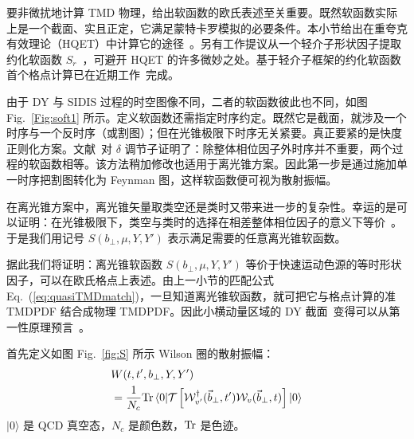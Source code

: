 要非微扰地计算 TMD 物理，给出软函数的欧氏表述至关重要。既然软函数实际上是一个截面、实且正定，它满足蒙特卡罗模拟的必要条件。本小节给出在重夸克有效理论（HQET）中计算它的途径~\cite{Ji:2019sxk}。另有工作提议从一个轻介子形状因子提取约化软函数 $S_r$~\cite{Ji:2019sxk}，可避开 HQET 的许多微妙之处。基于轻介子框架的约化软函数首个格点计算已在近期工作~\cite{Zhang:2020dbb}完成。

由于 DY 与 SIDIS 过程的时空图像不同，二者的软函数彼此也不同，如图 Fig.~\ref{Fig:soft1} 所示。定义软函数还需指定时序约定。既然它是截面，就涉及一个时序与一个反时序（或割图）；但在光锥极限下时序无关紧要。真正要紧的是快度正则化方案。文献~\cite{Vladimirov:2017ksc}对 $\delta$ 调节子证明了：除整体相位因子外时序并不重要，两个过程的软函数相等。该方法稍加修改也适用于离光锥方案。因此第一步是通过施加单一时序把割图转化为 Feynman 图，这样软函数便可视为散射振幅。

在离光锥方案中，离光锥矢量取类空还是类时又带来进一步的复杂性。幸运的是可以证明：在光锥极限下，类空与类时的选择在相差整体相位因子的意义下等价~\cite{future}。于是我们用记号 $S(b_\perp,\mu,Y,Y')$ 表示满足需要的任意离光锥软函数。

据此我们将证明：离光锥软函数 $S(b_\perp,\mu,Y,Y')$ 等价于快速运动色源的等时形状因子，可以在欧氏格点上表述。由上一小节的匹配公式 Eq.~(\ref{eq:quasiTMDmatch})，一旦知道离光锥软函数，就可把它与格点计算的准 TMDPDF 结合成物理 TMDPDF。因此小横动量区域的 DY 截面~\cite{Collins:1984kg}变得可以从第一性原理预言~\cite{Ji:2019sxk}。

首先定义如图 Fig.~\ref{fig:S} 所示 Wilson 圈的散射振幅：
\begin{align}\label{eq:W_t}
	&W(t,t',b_\perp,Y,Y')\nonumber \\
	&=\frac{1}{N_c}{\rm Tr\,}\langle0|{\cal T} \left[{\cal W}^{\dagger}_{v'}(\vec{b}_\perp,t'){\cal W}_{v}(\vec{b}_\perp,t)\right]|0\rangle
\end{align}
$|0\rangle$ 是 QCD 真空态，$N_c$ 是颜色数，${\rm Tr}$ 是色迹。

